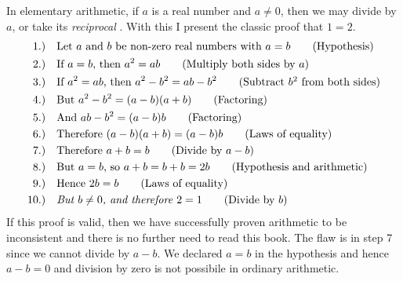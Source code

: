         \begin{example}
            In elementary arithmetic, if $a$ is a real number and $a\ne{0}$,
            then we may divide by $a$, or take its \textit{reciprocal}%
            . With this I present the classic proof that
            $1=2$.
            \begin{align}
                1.)\quad&
                \text{Let $a$ and $b$ be non-zero real numbers with $a=b$}
                \tag{Hypothesis}\\
                2.)\quad
                &\text{If $a=b$, then $a^{2}=ab$}
                \tag{Multiply both sides by $a$}\\
                3.)\quad
                &\text{If $a^{2}=ab$, then $a^{2}-b^{2}=ab-b^{2}$}
                \tag{Subtract $b^{2}$ from both sides}\\
                4.)\quad
                &\text{But $a^{2}-b^{2}=(a-b)(a+b)$}
                \tag{Factoring}\\
                5.)\quad
                &\text{And $ab-b^{2}=(a-b)b$}
                \tag{Factoring}\\
                6.)\quad
                &\text{Therefore $(a-b)(a+b)=(a-b)b$}
                \tag{Laws of equality}\\
                7.)\quad
                &\text{Therefore $a+b=b$}
                \tag{Divide by $a-b$}\\
                8.)\quad
                &\text{But $a=b$, so $a+b=b+b=2b$}
                \tag{Hypothesis and arithmetic}\\
                9.)\quad
                &\text{Hence $2b=b$}
                \tag{Laws of equality}\\
                10.)\quad
                &\textit{But $b\ne{0}$, and therefore $2=1$}
                \tag{Divide by $b$}
            \end{align}
            If this proof is valid, then we have successfully proven arithmetic
            to be inconsistent and there is no further need to read this book.
            The flaw is in step 7 since we cannot divide by $a-b$. We declared
            $a=b$ in the hypothesis and hence $a-b=0$ and division by zero is
            not possibile in ordinary arithmetic.
        \end{example}
